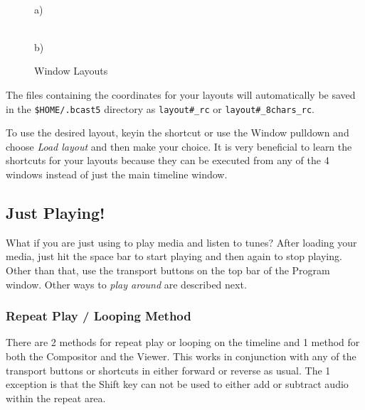 \begin{figure}[htpb]
    \centering
    \begin{minipage}{.49\linewidth}
        \\ a)
    \end{minipage}
    \begin{minipage}{.49\linewidth}
        \vspace{13ex}
        \\ b)
    \end{minipage}
    \caption{Window Layouts}
    \label{fig:window_layouts}
\end{figure}

The files containing the coordinates for your layouts will automatically be saved in the \texttt{\$HOME/.bcast5} directory as \texttt{layout\#\_rc} or \texttt{layout\#\_8chars\_rc}.

To use the desired layout, keyin the shortcut or use the Window pulldown and choose \emph{Load layout} and then make your choice. It is very beneficial to learn the shortcuts for your
layouts because they can be executed from any of the 4 windows instead of just the main
timeline window.

\subsection{Just Playing!}%
\label{sub:just_playing_}
What if you are just using \CGG{} to play media and listen to tunes? 
After loading your media, just hit the space bar to start playing and then again to stop playing.  
Other than that, use the transport buttons on the top bar of the Program window.  
Other ways to \textit{play around} are described next. 

\subsubsection*{Repeat Play / Looping Method}%
\label{ssub:repeat_play_looping_method}

There are 2 methods for repeat play or looping on the timeline and 1 method for both the Compositor and the Viewer.  This works in conjunction with any of the transport buttons or shortcuts in either forward or reverse as usual.  The 1 exception is that the Shift key can not be used to either add or subtract audio within the repeat area.

